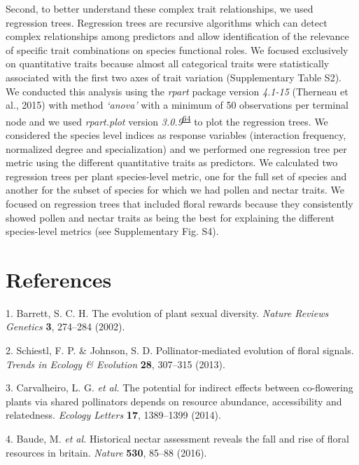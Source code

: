 \documentclass[12pt,a4paper,]{article}
\begin{document}
Second, to better understand these complex trait relationships, we used
regression trees. Regression trees are recursive algorithms which can
detect complex relationships among predictors and allow identification
of the relevance of specific trait combinations on species functional
roles. We focused exclusively on quantitative traits because almost all
categorical traits were statistically associated with the first two axes
of trait variation (Supplementary Table S2). We conducted this analysis
using the \emph{rpart} package version \emph{4.1-15} (Therneau et al.,
2015) with method \emph{`anova'} with a minimum of 50 observations per
terminal node and we used \emph{rpart.plot} version
\emph{3.0.9}\textsuperscript{\protect\hyperlink{ref-milborrow2015}{64}}
to plot the regression trees. We considered the species level indices as
response variables (interaction frequency, normalized degree and
specialization) and we performed one regression tree per metric using
the different quantitative traits as predictors. We calculated two
regression trees per plant species-level metric, one for the full set of
species and another for the subset of species for which we had pollen
and nectar traits. We focused on regression trees that included floral
rewards because they consistently showed pollen and nectar traits as
being the best for explaining the different species-level metrics (see
Supplementary Fig. S4).

\section{References}\label{references}

\hypertarget{refs}{}
\hypertarget{ref-barrett2002}{}
1. Barrett, S. C. H. The evolution of plant sexual diversity.
\emph{Nature Reviews Genetics} \textbf{3}, 274--284 (2002).

\hypertarget{ref-schiestl2013}{}
2. Schiestl, F. P. \& Johnson, S. D. Pollinator-mediated evolution of
floral signals. \emph{Trends in Ecology \& Evolution} \textbf{28},
307--315 (2013).

\hypertarget{ref-carvalheiro2014}{}
3. Carvalheiro, L. G. \emph{et al.} The potential for indirect effects
between co-flowering plants via shared pollinators depends on resource
abundance, accessibility and relatedness. \emph{Ecology Letters}
\textbf{17}, 1389--1399 (2014).

\hypertarget{ref-baude2016}{}
4. Baude, M. \emph{et al.} Historical nectar assessment reveals the fall
and rise of floral resources in britain. \emph{Nature} \textbf{530},
85--88 (2016).
\end{document}

